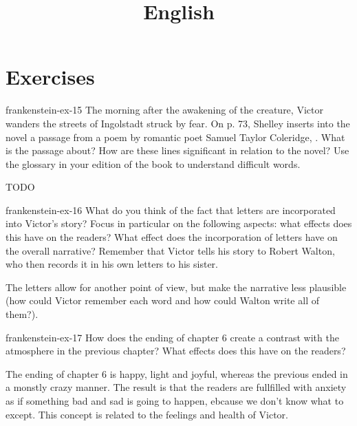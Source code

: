 \documentclass[preview]{standalone}
\begin{document}
\title{English}
\genpage

\section{Exercises}

\begin{snippetexercise}{frankenstein-ex-15}
    {The morning after the awakening of the creature, Victor wanders the streets of Ingolstadt struck
    by fear. On p. 73, Shelley inserts into the novel a passage from a poem by romantic poet Samuel
    Taylor Coleridge, . What is the passage about? How are these
    lines significant in relation to the novel? Use the glossary in your edition of the book to understand
    difficult words.}
    \begin{center}
    \end{center}
    
    TODO 
\end{snippetexercise}

\begin{snippetexercise}{frankenstein-ex-16}
    {What do you think of the fact that letters are incorporated into Victor's story? Focus in particular
    on the following aspects: what effects does this have on the readers? What effect does the
    incorporation of letters have on the overall narrative? Remember that Victor tells his story to Robert
    Walton, who then records it in his own letters to his sister.}
    
    The letters allow for another point of view, but make the narrative less plausible
    (how could Victor remember each word and how could Walton write all of them?).
\end{snippetexercise}

\begin{snippetexercise}{frankenstein-ex-17}
    {How does the ending of chapter 6 create a contrast with the atmosphere in the previous chapter?
    What effects does this have on the readers?}
    
    The ending of chapter 6 is happy, light and joyful, whereas the previous
    ended in a monstly crazy manner. The result is that the readers are fullfilled with anxiety
    as if something bad and sad is going to happen, ebcause we don't know what to except.
    This concept is related to the feelings and health of Victor.
\end{snippetexercise}
\end{document}

